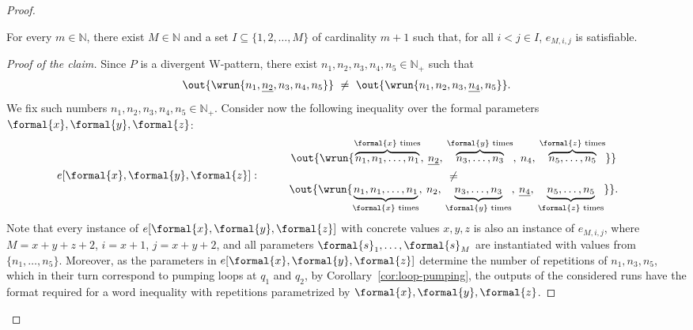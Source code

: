 \documentclass{article}
\begin{document}
\begin{proof}
\begin{claim*}
    For every $m \in \mathbb{N}$, there exist $M \in \mathbb{N}$ and a set $I \subseteq \{1,2,\ldots,M\}$ 
    of cardinality $m + 1$ such that, for all $i<j\in I$, $e_{M,i,j}$ is satisfiable.
\end{claim*}

\begin{proof}[Proof of the claim]
Since $P$ is a divergent W-pattern, there exist
$n_1,n_2,n_3,n_4,n_5 \in \mathbb{N}_+$ such that
\[
  \out{\wrun{n_1,\underline{n_2},n_3,n_4,n_5}}
  ~\neq~
  \out{\wrun{n_1,n_2,n_3,\underline{n_4},n_5}}. 
\]
We fix such numbers $n_1,n_2,n_3,n_4,n_5 \in \mathbb{N}_+$.
Consider now the following inequality over the formal parameters 
$\formal{x}, \formal{y}, \formal{z}$:
\begin{align*}
    &e[\formal{x}, \formal{y}, \formal{z}]: %
    \quad\left.
    \begin{array}{ccc}
         & \out{\wrun{
         \overbrace{n_1,n_1,\ldots,n_1}^{\formal{x} \textup{ times}}, \: \underline{n_2}, \:
         \overbrace{n_3,\ldots,n_3}^{\formal{y} \textup{ times}}, \: n_4, \:
         \overbrace{n_5,\ldots,n_5}^{\formal{z} \textup{ times}}}}\\[1ex]
         & \neq\\
         & \out{\wrun{
         \underbrace{n_1,n_1,\ldots,n_1}_{\formal{x} \textup{ times}}, \: n_2, \:
         \underbrace{n_3,\ldots,n_3}_{\formal{y} \textup{ times}}, \: \underline{n_4}, \:
         \underbrace{n_5,\ldots,n_5}_{\formal{z} \textup{ times}}}}.
    \end{array}
    \right.
\end{align*}
Note that every instance of $e[\formal{x}, \formal{y}, \formal{z}]$ 
with concrete values $x,y,z$ is also an instance of $e_{M,i,j}$, where 
$M=x+y+z+2$, $i=x+1$, $j=x+y+2$, and all parameters 
$\formal{s}_1, \ldots, \formal{s}_M$ are instantiated with values from $\{n_1, \ldots, n_5\}$. 
Moreover, as the parameters in $e[\formal{x}, \formal{y}, \formal{z}]$ determine the number of 
repetitions of $n_1,n_3,n_5$, which in their turn correspond to pumping 
loops at $q_1$ and $q_2$,
by Corollary~\ref{cor:loop-pumping}, the outputs of the considered runs 
have the format required for a word inequality with repetitions 
parametrized by $\formal{x}, \formal{y}, \formal{z}$.


\end{proof}
\end{proof}
\end{document}
